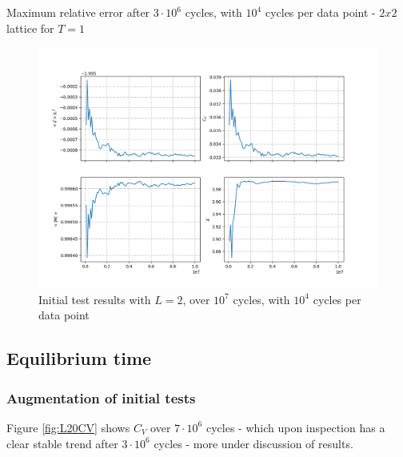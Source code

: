 \documentclass[%
oneside,                 %
final,                   %
10pt]{article}
\begin{document}
\begin{table}[h!tb]
    \centering
    \caption{Maximum relative error after $3 \cdot 10^6$ cycles, with $10^4$ cycles per data point - $2x2$ lattice for $T=1$}
\label{tab:abserrors}
\end{table}


\begin{figure}[!htb]
        \centering 
         \includegraphics[scale=.5]{../Results/initial_tests.png} 
        \caption{Initial test results with $L=2$, over $10^7$ cycles, with $10^4$ cycles per data point}
        \label{fig:initial_tests}   
\end{figure}  

\subsection{Equilibrium time}
\label{SS.R.EQtime }
\subsubsection*{Augmentation of initial tests}
Figure \ref{fig:L20CV} shows $C_V$ over $7 \cdot 10^6$ cycles - which upon  inspection has a clear stable trend after $3 \cdot 10^6$ cycles  - more under discussion of results. \newline
\end{document}
